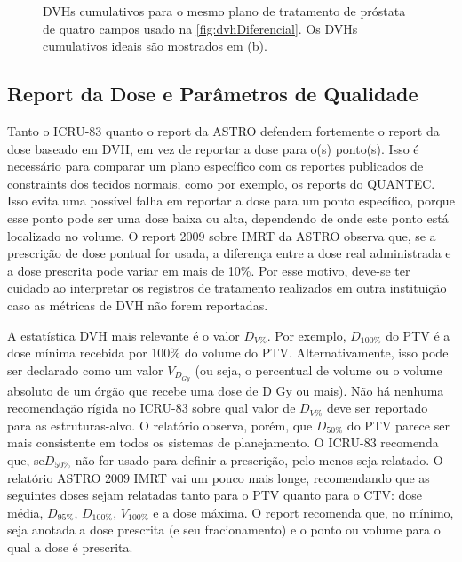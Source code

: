 \documentclass[11pt,a4paper]{article}
\newcounter{exemplo}
\begin{document}
\begin{figure}[h]
    \centering
    \caption{DVHs cumulativos para o mesmo plano de tratamento de próstata de quatro campos usado na \ref{fig:dvhDiferencial}. Os DVHs cumulativos ideais são mostrados em (b).}
    \label{fig:dvhCumulativo}
\end{figure}

\subsection{Report da Dose e Parâmetros de Qualidade}

	Tanto o ICRU-83 quanto o report da ASTRO defendem fortemente o report da dose baseado em DVH, em vez de reportar a dose para o(s) ponto(s). Isso é necessário para comparar um plano específico com os reportes publicados de constraints dos tecidos normais, como por exemplo, os reports do QUANTEC. Isso evita uma possível falha em reportar a dose para um ponto específico, porque esse ponto pode ser uma dose baixa ou alta, dependendo de onde este ponto está localizado no volume. O report 2009 sobre IMRT da ASTRO observa que, se a prescrição de dose pontual for usada, a diferença entre a dose real administrada e a dose prescrita pode variar em mais de 10\%. Por esse motivo, deve-se ter cuidado ao interpretar os registros de tratamento realizados em outra instituição caso as métricas de DVH não forem reportadas.

	A estatística DVH mais relevante é o valor $D_{V\%}$. Por exemplo,  $D_{100\%}$ do PTV é a dose mínima recebida por 100\% do volume do PTV. Alternativamente, isso pode ser declarado como um valor $V_{D_{Gy}}$ (ou seja, o percentual de volume ou o volume absoluto de um órgão que recebe uma dose de D Gy ou mais). Não há nenhuma recomendação rígida no ICRU-83 sobre qual valor de $D_{V\%}$ deve ser reportado para as estruturas-alvo. O relatório observa, porém, que $D_{50\%}$ do PTV parece ser mais consistente em todos os sistemas de planejamento. O ICRU-83 recomenda que, se$D_{50\%}$ não for usado para definir a prescrição, pelo menos seja relatado. O relatório ASTRO 2009 IMRT vai um pouco mais longe, recomendando que as seguintes doses sejam relatadas tanto para o PTV quanto para o CTV: dose média, $D_{95\%}$, $D_{100\%}$, $V_{100\%}$ e a dose máxima. O report recomenda que, no mínimo, seja anotada a dose prescrita (e seu fracionamento) e o ponto ou volume para o qual a dose é prescrita.
\end{document}
